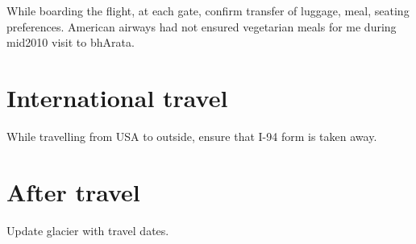 \documentclass[oneside, article]{memoir}
\begin{document}
While boarding the flight, at each gate, confirm transfer of luggage, meal, seating preferences. American airways had not ensured vegetarian meals for me during mid2010 visit to bhArata.

\section{International travel}
While travelling from USA to outside, ensure that I-94 form is taken away.

\section{After travel}
Update glacier with travel dates.
\end{document}
